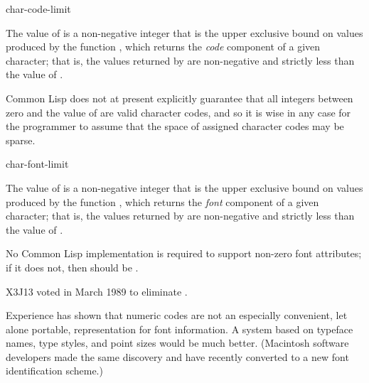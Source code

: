 \begin{defun}[Constant]
char-code-limit

The value of  is a non-negative
integer that is the upper exclusive bound on values produced
by the function , which returns the {\it code} component
of a given character; that is, the values returned by 
are non-negative and strictly less than the value of
.

\begin{new}
Common Lisp does not at present explicitly guarantee that all integers between
zero and the value of  are valid character codes, and so
it is wise in any case for the programmer to assume that the space of
assigned character codes may be sparse.
\end{new}
\end{defun}

\begin{obsolete}
\begin{defun}[Constant]
char-font-limit

The value of  is a non-negative
integer that is the upper exclusive bound on values produced
by the function , which returns the {\it font} component
of a given character; that is, the values returned by 
are non-negative and strictly less than the value of
.

\beforenoterule
\begin{implementation}
No Common Lisp implementation is required to support
non-zero font attributes; if it does not, then 
should be .
\end{implementation}
\afternoterule
\end{defun}
\end{obsolete}

\begin{newer}
X3J13 voted in March 1989 
to eliminate .

Experience has shown that numeric codes are not an especially
convenient, let alone portable, representation for font information.
A system based on typeface names, type styles, and point sizes would be much better.
(Macintosh software developers made the same discovery and have recently
converted to a new font identification scheme.)
\end{newer}

